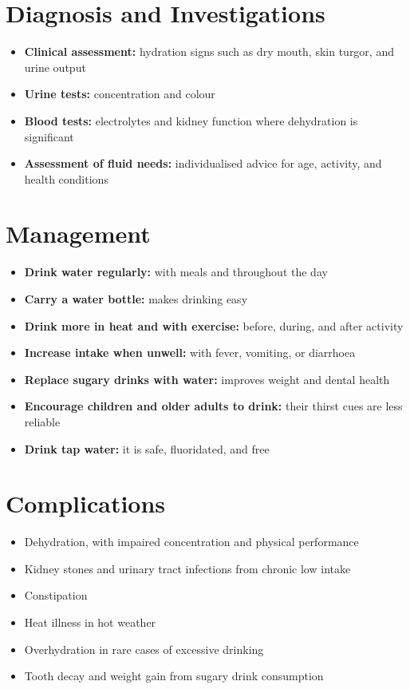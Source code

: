 \section*{Diagnosis and Investigations}
\begin{itemize}
    \item \textbf{Clinical assessment:} hydration signs such as dry mouth, skin turgor, and urine output
    \item \textbf{Urine tests:} concentration and colour
    \item \textbf{Blood tests:} electrolytes and kidney function where dehydration is significant
    \item \textbf{Assessment of fluid needs:} individualised advice for age, activity, and health conditions
\end{itemize}

\section*{Management}
\begin{itemize}
    \item \textbf{Drink water regularly:} with meals and throughout the day
    \item \textbf{Carry a water bottle:} makes drinking easy
    \item \textbf{Drink more in heat and with exercise:} before, during, and after activity
    \item \textbf{Increase intake when unwell:} with fever, vomiting, or diarrhoea
    \item \textbf{Replace sugary drinks with water:} improves weight and dental health
    \item \textbf{Encourage children and older adults to drink:} their thirst cues are less reliable
    \item \textbf{Drink tap water:} it is safe, fluoridated, and free
\end{itemize}

\section*{Complications}
\begin{itemize}
    \item Dehydration, with impaired concentration and physical performance
    \item Kidney stones and urinary tract infections from chronic low intake
    \item Constipation
    \item Heat illness in hot weather
    \item Overhydration in rare cases of excessive drinking
    \item Tooth decay and weight gain from sugary drink consumption
\end{itemize}

